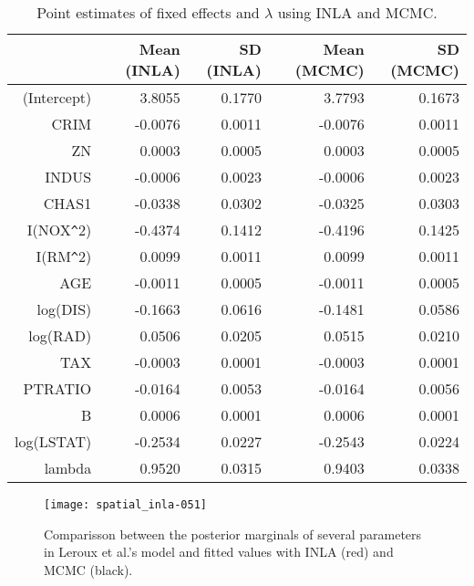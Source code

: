 \documentclass[article]{jss}
\begin{document}

\begin{table}[ht]
\centering
\begin{tabular}{rrrrr}
  \hline
 & Mean (INLA) & SD (INLA) & Mean (MCMC) & SD (MCMC) \\ 
  \hline
(Intercept) & 3.8055 & 0.1770 & 3.7793 & 0.1673 \\ 
  CRIM & -0.0076 & 0.0011 & -0.0076 & 0.0011 \\ 
  ZN & 0.0003 & 0.0005 & 0.0003 & 0.0005 \\ 
  INDUS & -0.0006 & 0.0023 & -0.0006 & 0.0023 \\ 
  CHAS1 & -0.0338 & 0.0302 & -0.0325 & 0.0303 \\ 
  I(NOX\verb|^|2) & -0.4374 & 0.1412 & -0.4196 & 0.1425 \\ 
  I(RM\verb|^|2) & 0.0099 & 0.0011 & 0.0099 & 0.0011 \\ 
  AGE & -0.0011 & 0.0005 & -0.0011 & 0.0005 \\ 
  log(DIS) & -0.1663 & 0.0616 & -0.1481 & 0.0586 \\ 
  log(RAD) & 0.0506 & 0.0205 & 0.0515 & 0.0210 \\ 
  TAX & -0.0003 & 0.0001 & -0.0003 & 0.0001 \\ 
  PTRATIO & -0.0164 & 0.0053 & -0.0164 & 0.0056 \\ 
  B & 0.0006 & 0.0001 & 0.0006 & 0.0001 \\ 
  log(LSTAT) & -0.2534 & 0.0227 & -0.2543 & 0.0224 \\ 
  lambda & 0.9520 & 0.0315 & 0.9403 & 0.0338 \\ 
   \hline
\end{tabular}
\caption{Point estimates of fixed effects and $\lambda$ using INLA and MCMC.} 
\label{tab:leroux}
\end{table}

\begin{figure}[h]
\begin{center}
\texttt{[image: spatial\_inla-051]}
\end{center}
\caption{Comparisson between the posterior marginals of several parameters in 
Leroux et al.'s model and fitted values with INLA (red) and MCMC (black).}
\label{fig:leroux}
\end{figure}
\end{document}
